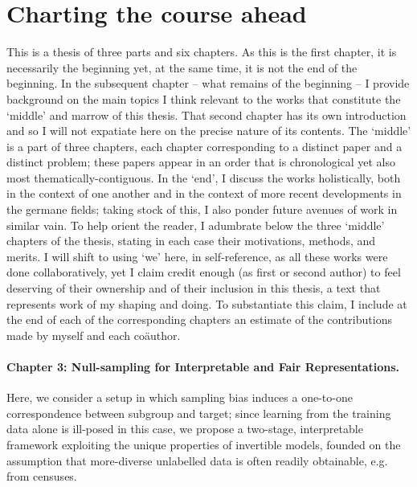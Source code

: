 
\section{Charting the course ahead}\label{sec:charting}
%
This is a thesis of three parts and six chapters. 
%
As this is the first chapter, it is necessarily the beginning yet, at the same time, it is not
the end of the beginning. 
%
In the subsequent chapter -- what remains of the beginning -- I provide background on the main
topics I think relevant to the works that constitute the `middle' and marrow of this thesis.
%
That second chapter has its own introduction and so I will not expatiate here on the precise
nature of its contents.
%
The `middle' is a part of three chapters, each chapter corresponding to a distinct paper and a
distinct problem; these papers appear in an order that is chronological yet also most
thematically-contiguous.
%
In the `end', I discuss the works holistically, both in the context of one another and in the
context of more recent developments in the germane fields; taking stock of this, I also ponder
future avenues of work in similar vain.
%
To help orient the reader, I adumbrate below the three `middle' chapters of the thesis, stating
in each case their motivations, methods, and merits. 
%
I will shift to using `we' here, in self-reference, as all these works were done collaboratively,
yet I claim credit enough (as first or second author) to feel deserving of their ownership and of
their inclusion in this thesis, a text that represents work of my shaping and doing.
%
To substantiate this claim, I include at the end of each of the corresponding chapters an estimate
of the contributions made by myself and each co{\"a}uthor.

\paragraph{Chapter 3: Null-sampling for Interpretable and Fair Representations.}
%
Here, we consider a setup in which sampling bias induces a one-to-one correspondence between
subgroup and target; since learning from the training data alone is ill-posed in this case, we
propose a two-stage, interpretable framework exploiting the unique properties of invertible models,
founded on the assumption that more-diverse unlabelled data is often readily obtainable, e.g. from
censuses.


